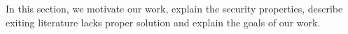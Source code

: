 
\fi


In this section, we motivate our work, explain the security properties, describe exiting literature lacks proper solution and explain the goals of our work.


